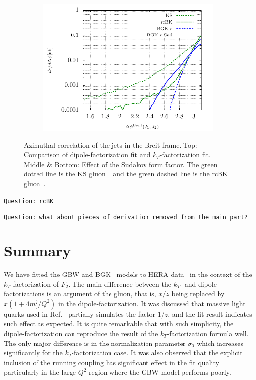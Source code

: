 \documentclass[11pt]{article}
\numberwithin{equation}{section}
\numberwithin{table}{section}
\numberwithin{figure}{section}
\newcommand{\comment}[1]{\texttt{\color{red}#1}}
\begin{document}
\begin{figure}[p]
\begin{subfigure}{0.5\textwidth}
	\end{subfigure}
	\begin{subfigure}{0.5\textwidth}
		\includegraphics[width=\textwidth]{plots/plotBGK3Jets}
	\end{subfigure}
\caption{\footnotesize Azimuthal correlation of the jets in the Breit frame. Top: Comparison of dipole-factorization fit and $k_T$-factorization fit. Middle \& Bottom: Effect of the Sudakov form factor. The green dotted line is the KS gluon~\cite{vanHameren:2021sqc}, and the green dashed line is the rcBK gluon~\cite{}. }
\label{fig:jj-breit}
\end{figure}

\comment{Question: rcBK}

\comment{Question: what about pieces of derivation removed from the main part?}

\section{Summary}
We have fitted the GBW\cite{Golec-Biernat:1998zce}
and BGK~\cite{Bartels:2002cj} models to HERA
data~\cite{Abt:2017nkc} in the context of the $k_T$-factorization of $F_2$.  The
main difference between the $k_T$- and dipole-factorizations is an argument of
the gluon, that is, $x/z$ being replaced by $x(1+4m_f^2/Q^2)$ in the
dipole-factorization. It was discussed that massive light quarks used in
Ref.~\cite{Golec-Biernat:1998zce} partially simulates the factor $1/z$, and the
fit result indicates such effect as expected. It is quite remarkable that with
such simplicity, the dipole-factorization can reproduce the result of the
$k_T$-factorization formula well. The only major difference is in the normalization parameter $\sigma_0$ which increases significantly for the $k_T$-factorization case. It was also observed that the explicit inclusion of the running coupling has significant effect in the fit quality particularly in the large-$Q^2$ region where the GBW model performs poorly. 
\end{document}
